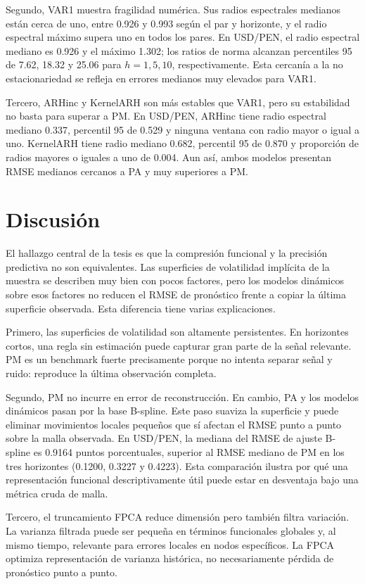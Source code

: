 \documentclass[12pt,a4paper]{article}
\newcommand{\SVIs}{superficies de volatilidad implícita}
\begin{document}
Segundo, VAR1 muestra fragilidad numérica. Sus radios espectrales medianos están cerca de uno, entre 0.926 y 0.993 según el par y horizonte, y el radio espectral máximo supera uno en todos los pares. En USD/PEN, el radio espectral mediano es 0.926 y el máximo 1.302; los ratios de norma alcanzan percentiles 95 de 7.62, 18.32 y 25.06 para \(h=1,5,10\), respectivamente. Esta cercanía a la no estacionariedad se refleja en errores medianos muy elevados para VAR1.

Tercero, ARHinc y KernelARH son más estables que VAR1, pero su estabilidad no basta para superar a PM. En USD/PEN, ARHinc tiene radio espectral mediano 0.337, percentil 95 de 0.529 y ninguna ventana con radio mayor o igual a uno. KernelARH tiene radio mediano 0.682, percentil 95 de 0.870 y proporción de radios mayores o iguales a uno de 0.004. Aun así, ambos modelos presentan RMSE medianos cercanos a PA y muy superiores a PM.

\section{Discusión}

El hallazgo central de la tesis es que la compresión funcional y la precisión predictiva no son equivalentes. Las \SVIs{} de la muestra se describen muy bien con pocos factores, pero los modelos dinámicos sobre esos factores no reducen el RMSE de pronóstico frente a copiar la última superficie observada. Esta diferencia tiene varias explicaciones.

Primero, las superficies de volatilidad son altamente persistentes. En horizontes cortos, una regla sin estimación puede capturar gran parte de la señal relevante. PM es un benchmark fuerte precisamente porque no intenta separar señal y ruido: reproduce la última observación completa.

Segundo, PM no incurre en error de reconstrucción. En cambio, PA y los modelos dinámicos pasan por la base B-spline. Este paso suaviza la superficie y puede eliminar movimientos locales pequeños que sí afectan el RMSE punto a punto sobre la malla observada. En USD/PEN, la mediana del RMSE de ajuste B-spline es 0.9164 puntos porcentuales, superior al RMSE mediano de PM en los tres horizontes (0.1200, 0.3227 y 0.4223). Esta comparación ilustra por qué una representación funcional descriptivamente útil puede estar en desventaja bajo una métrica cruda de malla.

Tercero, el truncamiento FPCA reduce dimensión pero también filtra variación. La varianza filtrada puede ser pequeña en términos funcionales globales y, al mismo tiempo, relevante para errores locales en nodos específicos. La FPCA optimiza representación de varianza histórica, no necesariamente pérdida de pronóstico punto a punto.
\end{document}
